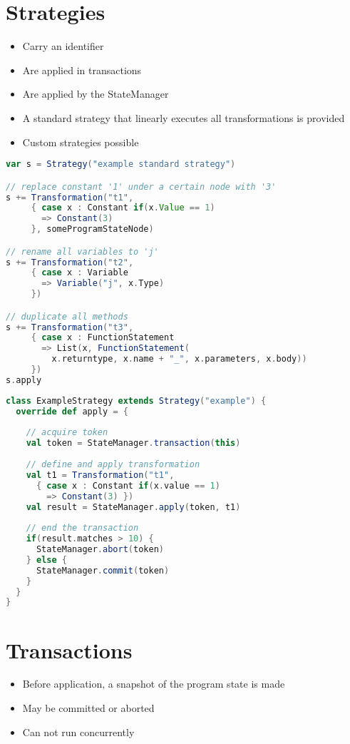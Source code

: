 \documentclass{article}
\begin{document}
\section{Strategies}
\begin{itemize}
 \item Carry an identifier
 \item Are applied in transactions
 \item Are applied by the StateManager
 \item A standard strategy that linearly executes all transformations is provided
 \item Custom strategies possible
\end{itemize}

\begin{lstlisting}[language=scala, escapechar=\%, breaklines=false]
var s = Strategy("example standard strategy")

// replace constant '1' under a certain node with '3'
s += Transformation("t1",
     { case x : Constant if(x.Value == 1)
       => Constant(3)
     }, someProgramStateNode)

// rename all variables to 'j'
s += Transformation("t2",
     { case x : Variable
       => Variable("j", x.Type)
     })

// duplicate all methods
s += Transformation("t3",
     { case x : FunctionStatement
       => List(x, FunctionStatement(
         x.returntype, x.name + "_", x.parameters, x.body))
     })
s.apply
\end{lstlisting}


\begin{lstlisting}[language=scala]
class ExampleStrategy extends Strategy("example") {
  override def apply = {
  
    // acquire token
    val token = StateManager.transaction(this)
    
    // define and apply transformation
    val t1 = Transformation("t1",
      { case x : Constant if(x.value == 1)
        => Constant(3) })
    val result = StateManager.apply(token, t1)
    
    // end the transaction
    if(result.matches > 10) {
      StateManager.abort(token)
    } else {
      StateManager.commit(token)
    }
  }
}
\end{lstlisting}




\section{Transactions}
\begin{itemize}
 \item Before application, a snapshot of the program state is made
 \item May be committed or aborted
 \item Can not run concurrently
\end{itemize}
\end{document}
